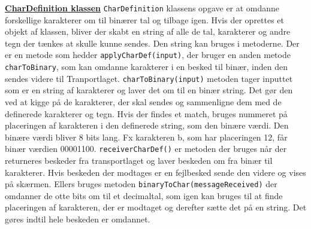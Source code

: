\hfill \break
\underline{\textbf{CharDefinition klassen}}
\newline
\texttt{CharDefinition} klassens opgave er at omdanne forskellige karakterer om til binærer tal og tilbage igen. Hvis der oprettes et objekt af klassen, bliver der skabt en string af alle de tal, karakterer og andre tegn der tænkes at skulle kunne sendes. Den string kan bruges i metoderne. Der er en metode som hedder \texttt{applyCharDef(input)}, der bruger en anden metode \texttt{charToBinary}, som kan omdanne karakterer i en besked til binær, inden den sendes videre til Tranportlaget.
\newline
\texttt{charToBinary(input)} metoden tager inputtet som er en string af karakterer og laver det om til en binær string. Det gør den ved at kigge på de karakterer, der skal sendes og sammenligne dem med de definerede karakterer og tegn. Hvis der findes et match, bruges nummeret på placeringen af karakteren i den definerede string, som den binære værdi. Den binære værdi bliver 8 bits lang. Fx karakteren b, som har placeringen 12, får binær værdien 00001100.
\newline
\texttt{receiverCharDef()} er metoden der bruges når der returneres beskeder fra transportlaget og laver beskeden om fra binær til karakterer. Hvis beskeden der modtages er en fejlbesked sende den videre og vises på skærmen. Ellers bruges metoden \texttt{binaryToChar(messageReceived)} der omdanner de otte bits om til et decimaltal, som igen kan bruges til at finde placeringen af karakteren, der er modtaget og derefter sætte det på en string. Det gøres indtil hele beskeden er omdannet.

